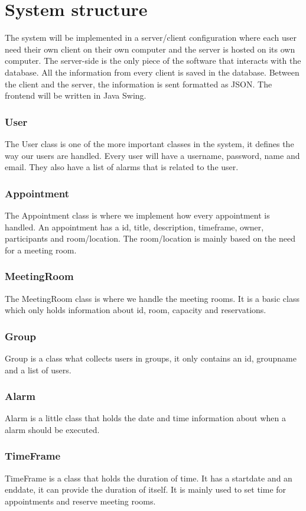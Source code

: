 \documentclass[a4paper, 10pt]{article}
\begin{document}
\section{System structure}
The system will be implemented in a server/client configuration where each user need their own client on their own computer and the server is hosted on its own computer. The server-side is the only piece of the software that interacts with the database. All the information from every client is saved in the database. Between the client and the server, the information is sent formatted as JSON. The frontend will be written in Java Swing.

\subsubsection{User}
The User class is one of the more important classes in the system, it defines the way our users are handled. Every user will have a username, password, name and email. They also have a list of alarms that is related to the user.

\subsubsection{Appointment}
The Appointment class is where we implement how every appointment is handled. An appointment has a id, title, description, timeframe, owner, participants and room/location. The room/location is mainly based on the need for a meeting room.

\subsubsection{MeetingRoom}
The MeetingRoom class is where we handle the meeting rooms. It is a basic class which only holds information about id, room, capacity and reservations.

\subsubsection{Group}
Group is a class what collects users in groups, it only contains an id, groupname and a list of users.

\subsubsection{Alarm}
Alarm is a little class that holds the date and time information about when a alarm should be executed.

\subsubsection{TimeFrame}
TimeFrame is a class that holds the duration of time. It has a startdate and an enddate, it can provide the duration of itself. It is mainly used to set time for appointments and reserve meeting rooms.
\end{document}
